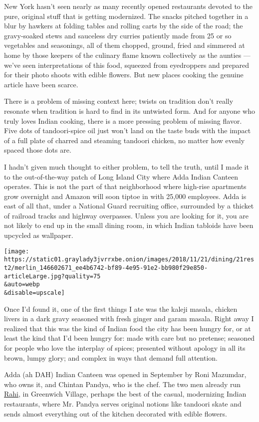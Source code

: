 New York hasn't seen nearly as many recently opened restaurants devoted
to the pure, original stuff that is getting modernized. The snacks
pitched together in a blur by hawkers at folding tables and rolling
carts by the side of the road; the gravy-soaked stews and sauceless dry
curries patiently made from 25 or so vegetables and seasonings, all of
them chopped, ground, fried and simmered at home by those keepers of the
culinary flame known collectively as the aunties --- we've seen
interpretations of this food, squeezed from eyedroppers and prepared for
their photo shoots with edible flowers. But new places cooking the
genuine article have been scarce.

There is a problem of missing context here; twists on tradition don't
really resonate when tradition is hard to find in its untwisted form.
And for anyone who truly loves Indian cooking, there is a more pressing
problem of missing flavor. Five dots of tandoori-spice oil just won't
land on the taste buds with the impact of a full plate of charred and
steaming tandoori chicken, no matter how evenly spaced those dots are.

I hadn't given much thought to either problem, to tell the truth, until
I made it to the out-of-the-way patch of Long Island City where Adda
Indian Canteen operates. This is not the part of that neighborhood where
high-rise apartments grow overnight and Amazon will soon tiptoe in with
25,000 employees. Adda is east of all that, under a National Guard
recruiting office, surrounded by a thicket of railroad tracks and
highway overpasses. Unless you are looking for it, you are not likely to
end up in the small dining room, in which Indian tabloids have been
upcycled as wallpaper.

\texttt{[image: https://static01.graylady3jvrrxbe.onion/images/2018/11/21/dining/21rest2/merlin\_146602671\_ee4b6742-bf89-4e95-91e2-bb980f29e850-articleLarge.jpg?quality=75\\\&auto=webp\\\&disable=upscale]}

Once I'd found it, one of the first things I ate was the kaleji masala,
chicken livers in a dark gravy seasoned with fresh ginger and garam
masala. Right away I realized that this was the kind of Indian food the
city has been hungry for, or at least the kind that I'd been hungry for:
made with care but no pretense; seasoned for people who love the
interplay of spices; presented without apology in all its brown, lumpy
glory; and complex in ways that demand full attention.

Adda (ah DAH) Indian Canteen was opened in September by Roni Mazumdar,
who owns it, and Chintan Pandya, who is the chef. The two men already
run \href{https://www.rahinyc.com/}{Rahi}, in Greenwich Village, perhaps
the best of the casual, modernizing Indian restaurants, where Mr. Pandya
serves original notions like tandoori skate and sends almost everything
out of the kitchen decorated with edible flowers.

